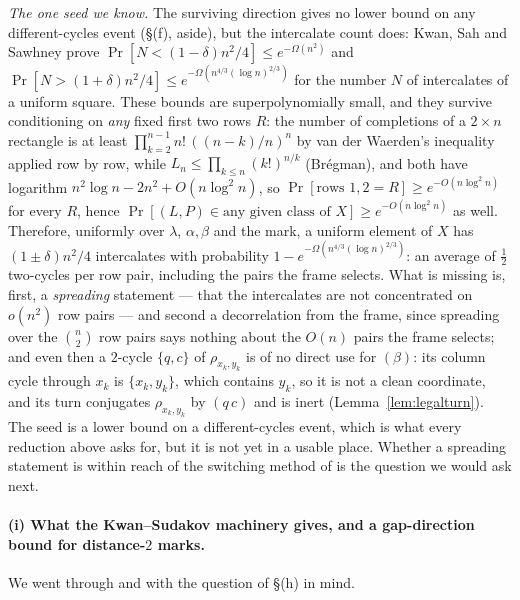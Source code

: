 \emph{The one seed we know.}  The surviving direction gives no lower
bound on any different-cycles event (\S(f), aside), but the intercalate
count does: Kwan, Sah and Sawhney \cite{KSS21} prove
$\Pr[N<(1-\delta)n^2/4]\le e^{-\Omega(n^2)}$ and
$\Pr[N>(1+\delta)n^2/4]\le e^{-\Omega(n^{4/3}(\log n)^{2/3})}$ for the
number $N$ of intercalates of a uniform square.  These bounds are
superpolynomially small, and they survive conditioning on \emph{any}
fixed first two rows $R$: the number of completions of a $2\times n$
rectangle is at least $\prod_{k=2}^{n-1}n!\,((n-k)/n)^n$ by van der
Waerden's inequality applied row by row, while $L_n\le\prod_{k\le n}(k!)^{n/k}$
(Br\'egman), and both have logarithm $n^2\log n-2n^2+O(n\log^2n)$, so
$\Pr[\text{rows }1,2=R]\ge e^{-O(n\log^2n)}$ for every $R$, hence
$\Pr[(L,P)\in\text{any given class of }X]\ge e^{-O(n\log^2n)}$ as well.
Therefore, uniformly over $\lambda$, $\alpha,\beta$ and the mark, a
uniform element of $X$ has $(1\pm\delta)n^2/4$ intercalates with
probability $1-e^{-\Omega(n^{4/3}(\log n)^{2/3})}$: an average of
$\tfrac12$ two-cycles per row pair, including the pairs the frame
selects.  What is missing is, first, a
\emph{spreading} statement --- that the intercalates are not
concentrated on $o(n^2)$ row pairs --- and second a decorrelation
from the frame, since spreading over the $\binom n2$ row pairs says
nothing about the $O(n)$ pairs the frame selects; and even then a
$2$-cycle $\{q,c\}$ of $\rho_{x_k,y_k}$ is of no direct use for
$(\beta)$: its column cycle through $x_k$ is $\{x_k,y_k\}$, which
contains $y_k$, so it is not a clean coordinate, and its turn
conjugates $\rho_{x_k,y_k}$ by $(q\,c)$ and is inert
(Lemma~\ref{lem:legalturn}).  The seed is a lower bound on a
different-cycles event, which is what every reduction above asks for,
but it is not yet in a usable place.  Whether a spreading statement is
within reach of the switching method of \cite{KS18} is the question we
would ask next.

\paragraph{(i) What the Kwan--Sudakov machinery gives, and a
gap-direction bound for distance-$2$ marks.}  We went through
\cite{KS18} and \cite{KSS21} with the question of \S(h) in mind.

